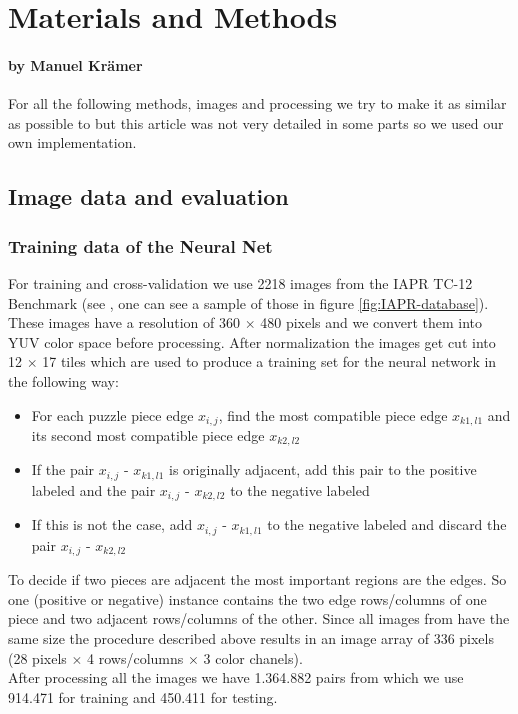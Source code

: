 \documentclass[11pt]{report}
\begin{document}
\chapter{Materials and Methods}
\subsubsection*{by Manuel Krämer}

For all the following methods, images and processing we try to make it as similar as possible to \cite{sholomon2016dnn} but this article was not very detailed in some parts so we used our own implementation.

\section{Image data and evaluation}
\subsection{Training data of the Neural Net}
For training and cross-validation we use 2218 images from the IAPR TC-12 Benchmark (see \cite{grubinger06}, one can see a sample of those in figure \ref{fig:IAPR-database}). These images have a resolution of 360 $\times$ 480 pixels and we convert them into YUV color space before processing. After normalization the images get cut into 12 $\times$ 17 tiles which are used to produce a training set for the neural network in the following way:
\begin{itemize}
	\item For each puzzle piece edge $x_{i,j}$, find the most compatible piece edge $x_{k1,l1}$ and its second most compatible piece edge $x_{k2,l2}$
	\item  If the pair $x_{i,j}$ - $x_{k1,l1}$ is originally adjacent, add this pair to the positive labeled and the pair $x_{i,j}$ - $x_{k2,l2}$ to the negative labeled
	\item If this is not the case, add $x_{i,j}$ - $x_{k1,l1}$ to the negative labeled and discard the pair $x_{i,j}$ - $x_{k2,l2}$
\end{itemize}
To decide if two pieces are adjacent the most important regions are the edges. So one (positive or negative) instance contains the two edge rows/columns of one piece and two adjacent rows/columns of the other. Since all images from \cite{grubinger06} have the same size the procedure described above results in an image array of 336 pixels (28 pixels $\times$ 4 rows/columns $\times$ 3 color chanels). \\
After processing all the images we have 1.364.882 pairs from which we use 914.471 for training and 450.411 for testing.
\end{document}
